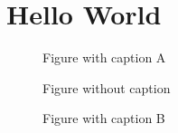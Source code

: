 \documentclass{article}
\begin{document}
\section{Hello World}
\begin{figure}
\caption{Figure with caption A}
\end{figure}
\capstartfalse
\begin{figure}
Figure without caption
\end{figure}
\capstarttrue
\begin{figure}
\caption{Figure with caption B}
\end{figure}
\end{document}
